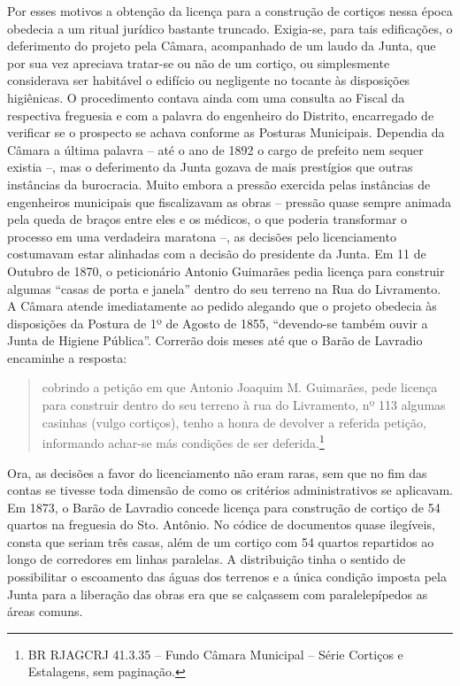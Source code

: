 Por esses motivos a obtenção da licença para a construção de cortiços
nessa época obedecia a um ritual jurídico bastante truncado. Exigia-se,
para tais edificações, o deferimento do projeto pela Câmara, acompanhado
de um laudo da Junta, que por sua vez apreciava tratar-se ou não de um
cortiço, ou simplesmente considerava ser habitável o edifício ou
negligente no tocante às disposições higiênicas. O procedimento contava
ainda com uma consulta ao Fiscal da respectiva freguesia e com a palavra
do engenheiro do Distrito, encarregado de verificar se o prospecto se
achava conforme as Posturas Municipais. Dependia da Câmara a última
palavra -- até o ano de 1892 o cargo de prefeito nem sequer existia --,
mas o deferimento da Junta gozava de mais prestígios que outras
instâncias da burocracia. Muito embora a pressão exercida pelas
instâncias de engenheiros municipais que fiscalizavam as obras --
pressão quase sempre animada pela queda de braços entre eles e os
médicos, o que poderia transformar o processo em uma verdadeira maratona
--, as decisões pelo licenciamento costumavam estar alinhadas com a
decisão do presidente da Junta. Em 11 de Outubro de 1870, o peticionário
Antonio Guimarães pedia licença para construir algumas ``casas de porta
e janela'' dentro do seu terreno na Rua do Livramento. A Câmara atende
imediatamente ao pedido alegando que o projeto obedecia às disposições
da Postura de 1º de Agosto de 1855, ``devendo-se também ouvir a Junta de
Higiene Pública''. Correrão dois meses até que o Barão de Lavradio
encaminhe a resposta:

\begin{quote}
cobrindo a petição em que Antonio Joaquim M. Guimarães, pede licença
para construir dentro do seu terreno à rua do Livramento, nº 113 algumas
casinhas (vulgo cortiços), tenho a honra de devolver a referida petição,
informando achar-se más condições de ser deferida.\footnote{BR RJAGCRJ
  41.3.35 -- Fundo Câmara Municipal -- Série Cortiços e Estalagens, sem
  paginação.}
\end{quote}

Ora, as decisões a favor do licenciamento não eram raras, sem que no fim
das contas se tivesse toda dimensão de como os critérios administrativos
se aplicavam. Em 1873, o Barão de Lavradio concede licença para
construção de cortiço de 54 quartos na freguesia do Sto. Antônio. No
códice de documentos quase ilegíveis, consta que seriam três casas, além
de um cortiço com 54 quartos repartidos ao longo de corredores em linhas
paralelas. A distribuição tinha o sentido de possibilitar o escoamento
das águas dos terrenos e a única condição imposta pela Junta para a
liberação das obras era que se calçassem com paralelepípedos as áreas
comuns.


